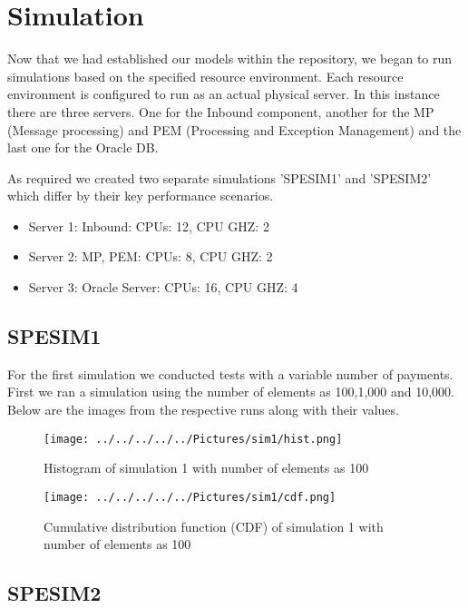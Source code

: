 \documentclass[a4paper,11pt]{report}
\begin{document}
\chapter*{Simulation}
Now that we had established our models within the repository, we
began to run simulations based on the specified resource environment.
Each resource environment is configured to run as an actual physical server. In this instance there are three servers. One for the Inbound component, another for the MP (Message processing) and PEM (Processing and Exception Management) and the last one for the Oracle DB.

As required we created two separate simulations 'SPESIM1' and
'SPESIM2' which differ by their key performance scenarios.

\begin{itemize}
\item Server 1: Inbound: CPUs: 12, CPU GHZ: 2
\item Server 2: MP, PEM: CPUs: 8, CPU GHZ: 2
\item Server 3: Oracle Server: CPUs: 16, CPU GHZ: 4
\end{itemize}

\section*{SPESIM1}
For the first simulation we conducted tests with a variable number of payments. First we ran a simulation using the number of elements as 100,1,000 and 10,000.
Below are the images from the respective runs along with their values.
\begin{figure}[hbtp]
\caption{Histogram of simulation 1 with number of elements as 100}
\centering
\texttt{[image: ../../../../../Pictures/sim1/hist.png]}
\end{figure}

\begin{figure}[hbtp]
\caption{Cumulative distribution function (CDF) of simulation 1 with number of elements as 100}
\centering
\texttt{[image: ../../../../../Pictures/sim1/cdf.png]}
\end{figure}

\section*{SPESIM2}

\end{document}
